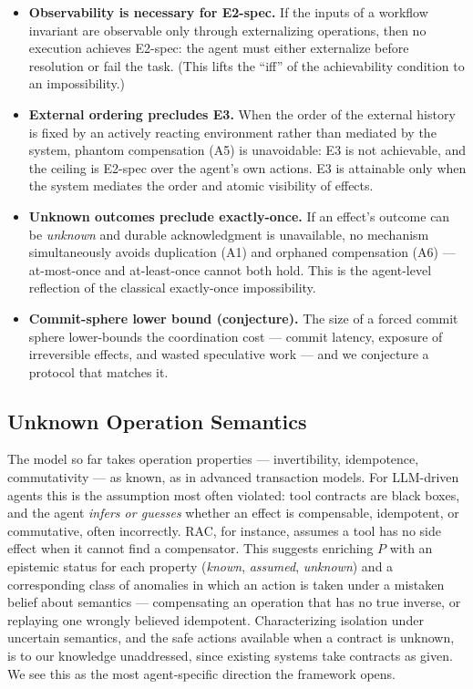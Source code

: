 \documentclass[11pt]{article}
\begin{document}
\begin{itemize}
\item \textbf{Observability is necessary for E2-spec.} If the inputs of a
workflow invariant are observable only through externalizing operations,
then no execution achieves E2-spec: the agent must either externalize
before resolution or fail the task. (This lifts the ``iff'' of the
achievability condition to an impossibility.)

\item \textbf{External ordering precludes E3.} When the order of the
external history is fixed by an actively reacting environment rather than
mediated by the system, phantom compensation (A5) is unavoidable: E3 is
not achievable, and the ceiling is E2-spec over the agent's own actions.
E3 is attainable only when the system mediates the order and atomic
visibility of effects.

\item \textbf{Unknown outcomes preclude exactly-once.} If an effect's
outcome can be \emph{unknown} and durable acknowledgment is unavailable, no
mechanism simultaneously avoids duplication (A1) and orphaned compensation
(A6) --- at-most-once and at-least-once cannot both hold. This is the
agent-level reflection of the classical exactly-once impossibility.

\item \textbf{Commit-sphere lower bound (conjecture).} The size of a forced
commit sphere lower-bounds the coordination cost --- commit latency,
exposure of irreversible effects, and wasted speculative work --- and we
conjecture a protocol that matches it.
\end{itemize}

\subsection{Unknown Operation Semantics}
\label{sec:unknown}

The model so far takes operation properties --- invertibility, idempotence,
commutativity --- as known, as in advanced transaction models. For
LLM-driven agents this is the assumption most often violated: tool contracts
are black boxes, and the agent \emph{infers or guesses} whether an effect is
compensable, idempotent, or commutative, often incorrectly. RAC, for
instance, assumes a tool has no side effect when it cannot find a
compensator. This suggests enriching $P$ with an epistemic status for each
property (\emph{known}, \emph{assumed}, \emph{unknown}) and a corresponding
class of anomalies in which an action is taken under a mistaken belief about
semantics --- compensating an operation that has no true inverse, or
replaying one wrongly believed idempotent. Characterizing isolation under
uncertain semantics, and the safe actions available when a contract is
unknown, is to our knowledge unaddressed, since existing systems take
contracts as given. We see this as the most agent-specific direction the
framework opens.
\end{document}
